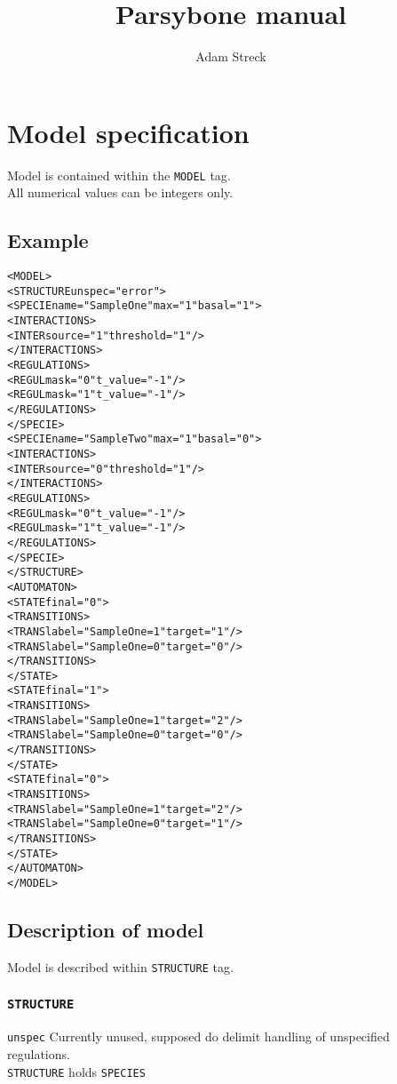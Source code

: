 \documentclass[12pt]{article}
\title{Parsybone manual}
\author{Adam Streck}
\begin{document}
  \maketitle

\section{Model specification}
Model is contained within the \texttt{MODEL} tag. \\
All numerical values can be integers only.

\subsection{Example}
\begin{alltt}
<MODEL>
   <STRUCTURE unspec="error">
      <SPECIE name="SampleOne" max="1" basal="1">
         <INTERACTIONS>
            <INTER source="1" threshold ="1" />
         </INTERACTIONS>
         <REGULATIONS>
            <REGUL mask="0" t_value="-1" />
            <REGUL mask="1" t_value="-1" />
         </REGULATIONS>
      </SPECIE>
      <SPECIE name="SampleTwo" max="1" basal="0">
         <INTERACTIONS>
            <INTER source="0" threshold ="1" />
         </INTERACTIONS>
         <REGULATIONS>
            <REGUL mask="0" t_value="-1" />
            <REGUL mask="1" t_value="-1" />
         </REGULATIONS>
      </SPECIE>
   </STRUCTURE>
   <AUTOMATON>
      <STATE final="0">
         <TRANSITIONS>
            <TRANS label="SampleOne=1" target="1" />
            <TRANS label="SampleOne=0" target="0" />
         </TRANSITIONS>
      </STATE>
      <STATE final="1">
         <TRANSITIONS>
            <TRANS label="SampleOne=1" target="2" />
            <TRANS label="SampleOne=0" target="0" />
         </TRANSITIONS>
      </STATE>
      <STATE final="0">
         <TRANSITIONS>
            <TRANS label="SampleOne=1" target="2" />
            <TRANS label="SampleOne=0" target="1" />
         </TRANSITIONS>
      </STATE>
   </AUTOMATON>
</MODEL>
\end{alltt}
\subsection{Description of model}
Model is described within \texttt{STRUCTURE} tag.

\subsubsection {\texttt{STRUCTURE} }
\texttt{unspec} Currently unused, supposed do delimit handling of unspecified regulations. \\
\texttt{STRUCTURE} holds \texttt{SPECIES}
\end{document}
